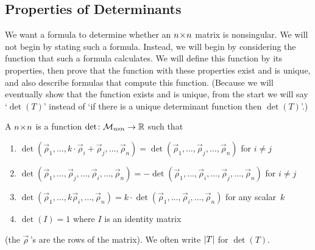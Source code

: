 



















\subsection{Properties of Determinants}
We want a formula
to determine whether an $n \! \times \! n$  matrix is nonsingular.
We will not begin by stating such a formula.
Instead, we will begin by considering the function that such a formula
calculates.
We will define this function by its properties,
then prove that the function with these properties exist and is unique,
and also describe formulas that compute this function.
(Because we will eventually show that the function exists and is unique, 
from the start we will say `\( \det(T) \)' instead of
`if there is a unique determinant function then \( \det(T) \)'.)

\begin{definition}
\label{def:Det}
A \( n \! \times \! n \) %
 is a function
\( \mbox{$\det\colon \mathcal{M}_{n \! \times \! n}\to \mathbb{R}$} \) such that
\begin{enumerate}
  \item
    $
       \det (\vec{\rho}_1,\dots,k\cdot\vec{\rho}_i 
                                    + \vec{\rho}_j,\dots,\vec{\rho}_n)
       =\det (\vec{\rho}_1,\dots,\vec{\rho}_j,\dots,\vec{\rho}_n)
    $ for \( i\ne j \)
  \item 
    $
       \det (\vec{\rho}_1,\ldots,\vec{\rho}_j,
               \dots,\vec{\rho}_i,\dots,\vec{\rho}_n)
       = -\det (\vec{\rho}_1,\dots,\vec{\rho}_i,\dots,\vec{\rho}_j,
                \dots,\vec{\rho}_n)
    $
    for \( i\ne j\)
  \item
    $
       \det (\vec{\rho}_1,\dots,k\vec{\rho}_i,\dots,\vec{\rho}_n)
       = k\cdot \det (\vec{\rho}_1,\dots,\vec{\rho}_i,\dots,\vec{\rho}_n)
    $
    for any scalar~$k$
  \item 
     $
       \det(I)=1
     $
     where \( I \) is an identity matrix
\end{enumerate}
(the $\vec{\rho}\,$'s are the rows of the matrix).
We often write \( \deter{T} \) for \( \det (T) \).
\end{definition}

